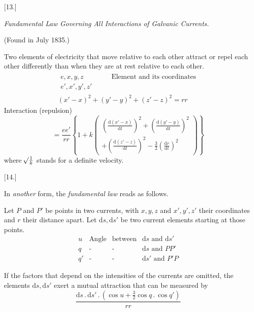 \begin{center}[13.]\par\medskip\textit{Fundamental Law Governing All Interactions of Galvanic Currents.}\par\smallskip(Found in July 1835.)\end{center}
Two elements of electricity that move relative to each other attract or repel each other differently than when they are at rest relative to each other.
\[
\begin{gathered}
\begin{aligned}
e,x,y,z&\qquad\text{Element and its coordinates}\\
e',x',y',z'&
\end{aligned}\\[4pt]
(x'-x)^2+(y'-y)^2+(z'-z)^2=rr
\end{gathered}
\]
Interaction (repulsion)
\[
=\frac{ee'}{rr}\left\{1+k\left(\begin{gathered}
\left(\frac{\mathrm d(x'-x)}{\mathrm dt}\right)^2+\left(\frac{\mathrm d(y'-y)}{\mathrm dt}\right)^2\\
+\left(\frac{\mathrm d(z'-z)}{\mathrm dt}\right)^2-\tfrac{3}{2}\left(\frac{\mathrm dr}{\mathrm dt}\right)^2
\end{gathered}\right)\right\}
\]
where $\mathord{{}^{}\!\surd}\frac{1}{k}$ stands for a definite velocity.

\begin{center}[14.]\end{center}
In \textit{another} form, the \textit{fundamental law} reads as follows.

Let $P$ and $P'$ be points in two currents, with $x,y,z$ and $x',y',z'$ their coordinates and $r$ their distance apart. Let $\mathrm ds,\mathrm ds'$ be two current elements starting at those points.
\[
\begin{array}{rllll}
u&\text{Angle}&\text{between}&\mathrm ds\text{ and }\mathrm ds'\\
q&\text{-}&\text{-}&\mathrm ds\text{ and }PP'\\
q'&\text{-}&\text{-}&\mathrm ds'\text{ and }P'P
\end{array}
\]

If the factors that depend on the intensities of the currents are omitted, the elements $\mathrm ds,\mathrm ds'$ exert a mutual attraction that can be measured by
\[
\frac{\mathrm ds\,.\,\mathrm ds'\,.\,(\cos u+\tfrac{3}{2}\cos q\,.\,\cos q')}{rr}
\]

